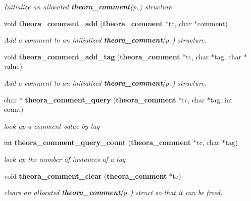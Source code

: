 \begin{CompactItemize}
\begin{CompactList}\small\item\em Initialize an allocated {\bf theora\_\-comment}{\rm (p.\,\pageref{structtheora__comment})} structure. \item\end{CompactList}\item 
void {\bf theora\_\-comment\_\-add} ({\bf theora\_\-comment} $\ast$tc, char $\ast$comment)
\begin{CompactList}\small\item\em Add a comment to an initialized {\bf theora\_\-comment}{\rm (p.\,\pageref{structtheora__comment})} structure. \item\end{CompactList}\item 
void {\bf theora\_\-comment\_\-add\_\-tag} ({\bf theora\_\-comment} $\ast$tc, char $\ast$tag, char $\ast$value)
\begin{CompactList}\small\item\em Add a comment to an initialized {\bf theora\_\-comment}{\rm (p.\,\pageref{structtheora__comment})} structure. \item\end{CompactList}\item 
char $\ast$ {\bf theora\_\-comment\_\-query} ({\bf theora\_\-comment} $\ast$tc, char $\ast$tag, int count)
\begin{CompactList}\small\item\em look up a comment value by tag \item\end{CompactList}\item 
int {\bf theora\_\-comment\_\-query\_\-count} ({\bf theora\_\-comment} $\ast$tc, char $\ast$tag)
\begin{CompactList}\small\item\em look up the number of instances of a tag \item\end{CompactList}\item 
void {\bf theora\_\-comment\_\-clear} ({\bf theora\_\-comment} $\ast$tc)\label{theora_8h_a37}

\begin{CompactList}\small\item\em clears an allocated {\bf theora\_\-comment}{\rm (p.\,\pageref{structtheora__comment})} struct so that it can be freed. \item\end{CompactList}\end{CompactItemize}


